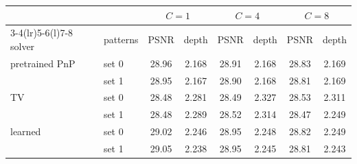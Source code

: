 \begin{tabular}{@{}ll cc cc cc@{}}\toprule
 & & \multicolumn{2}{c}{$C=1$} & \multicolumn{2}{c}{$C=4$} & \multicolumn{2}{c}{$C=8$}\\
\cmidrule(lr){3-4}\cmidrule(lr){5-6}\cmidrule(l){7-8}
solver & patterns & PSNR & depth & PSNR & depth & PSNR & depth\\\midrule
pretrained PnP & set 0 & 28.96 & 2.168 & 28.91 & 2.168 & 28.83 & 2.169\\
 & set 1 & 28.95 & 2.167 & 28.90 & 2.168 & 28.81 & 2.169\\
\midrule
TV & set 0 & 28.48 & 2.281 & 28.49 & 2.327 & 28.53 & 2.311\\
 & set 1 & 28.48 & 2.289 & 28.52 & 2.314 & 28.47 & 2.249\\
\midrule
learned & set 0 & 29.02 & 2.246 & 28.95 & 2.248 & 28.82 & 2.249\\
 & set 1 & 29.05 & 2.238 & 28.95 & 2.245 & 28.81 & 2.243\\
\bottomrule\end{tabular}
